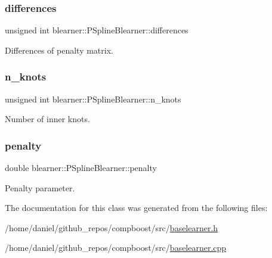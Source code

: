 \subsubsection{\texorpdfstring{differences}{differences}}
{\footnotesize\ttfamily unsigned int blearner\+::\+P\+Spline\+Blearner\+::differences\hspace{0.3cm}{\ttfamily [private]}}



Differences of penalty matrix. 

\mbox{\label{classblearner_1_1_p_spline_blearner_aac64be7a6b73d4dfc38dd892315ff4be}} 
\subsubsection{\texorpdfstring{n\+\_\+knots}{n\_knots}}
{\footnotesize\ttfamily unsigned int blearner\+::\+P\+Spline\+Blearner\+::n\+\_\+knots\hspace{0.3cm}{\ttfamily [private]}}



Number of inner knots. 

\mbox{\label{classblearner_1_1_p_spline_blearner_ac456be9d0280c3b56ffb5bd5609910ab}} 
\subsubsection{\texorpdfstring{penalty}{penalty}}
{\footnotesize\ttfamily double blearner\+::\+P\+Spline\+Blearner\+::penalty\hspace{0.3cm}{\ttfamily [private]}}



Penalty parameter. 



The documentation for this class was generated from the following files\+:\begin{DoxyCompactItemize}
\item 
/home/daniel/github\+\_\+repos/compboost/src/\hyperlink{baselearner_8h}{baselearner.\+h}\item 
/home/daniel/github\+\_\+repos/compboost/src/\hyperlink{baselearner_8cpp}{baselearner.\+cpp}\end{DoxyCompactItemize}
